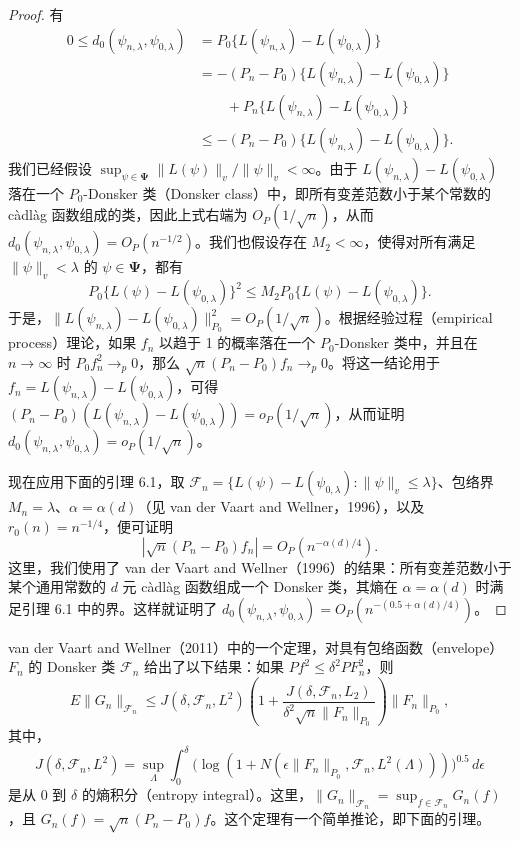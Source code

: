 \begin{proof}
有
\[
 \begin{aligned}
 0\leq d_0(\psi_{n,\lambda},\psi_{0,\lambda})
   & =P_0\{L(\psi_{n,\lambda})-L(\psi_{0,\lambda})\}\\
   & =-(P_n-P_0)\{L(\psi_{n,\lambda})-L(\psi_{0,\lambda})\}\\
   & \qquad{}+P_n\{L(\psi_{n,\lambda})-L(\psi_{0,\lambda})\}\\
   & \leq-(P_n-P_0)\{L(\psi_{n,\lambda})-L(\psi_{0,\lambda})\}.
 \end{aligned}
\]
我们已经假设 $\sup_{\psi\in\boldsymbol{\Psi}}\|L(\psi)\|_v/\|\psi\|_v<\infty$。由于 $L(\psi_{n,\lambda})-L(\psi_{0,\lambda})$ 落在一个 $P_0$-Donsker 类（Donsker class）中，即所有变差范数小于某个常数的 càdlàg 函数组成的类，因此上式右端为 $O_P(1/\sqrt n)$，从而 $d_0(\psi_{n,\lambda},\psi_{0,\lambda})=O_P(n^{-1/2})$。我们也假设存在 $M_2<\infty$，使得对所有满足 $\|\psi\|_v<\lambda$ 的 $\psi\in\boldsymbol{\Psi}$，都有
\[
 P_0\{L(\psi)-L(\psi_{0,\lambda})\}^2
   \leq M_2P_0\{L(\psi)-L(\psi_{0,\lambda})\}.
\]
于是，$\|L(\psi_{n,\lambda})-L(\psi_{0,\lambda})\|_{P_0}^2=O_P(1/\sqrt n)$。根据经验过程（empirical process）理论，如果 $f_n$ 以趋于 1 的概率落在一个 $P_0$-Donsker 类中，并且在 $n\to\infty$ 时 $P_0f_n^2\to_p0$，那么 $\sqrt n(P_n-P_0)f_n\to_p0$。将这一结论用于 $f_n=L(\psi_{n,\lambda})-L(\psi_{0,\lambda})$，可得 $(P_n-P_0)(L(\psi_{n,\lambda})-L(\psi_{0,\lambda}))=o_P(1/\sqrt n)$，从而证明 $d_0(\psi_{n,\lambda},\psi_{0,\lambda})=o_P(1/\sqrt n)$。

现在应用下面的引理 6.1，取 $\mathcal F_n=\{L(\psi)-L(\psi_{0,\lambda}):\|\psi\|_v\leq\lambda\}$、包络界 $M_n=\lambda$、$\alpha=\alpha(d)$（见 van der Vaart and Wellner，1996），以及 $r_0(n)=n^{-1/4}$，便可证明
\[
 |\sqrt n(P_n-P_0)f_n|=O_P(n^{-\alpha(d)/4}).
\]
这里，我们使用了 van der Vaart and Wellner（1996）的结果：所有变差范数小于某个通用常数的 $d$ 元 càdlàg 函数组成一个 Donsker 类，其熵在 $\alpha=\alpha(d)$ 时满足引理 6.1 中的界。这样就证明了 $d_0(\psi_{n,\lambda},\psi_{0,\lambda})=O_P(n^{-(0.5+\alpha(d)/4)})$。
\end{proof}

van der Vaart and Wellner（2011）中的一个定理，对具有包络函数（envelope）$F_n$ 的 Donsker 类 $\mathcal F_n$ 给出了以下结果：如果 $Pf^2\leq\delta^2PF_n^2$，则
\[
 E\|G_n\|_{\mathcal F_n}
 \leq J(\delta,\mathcal F_n,L^2)
       \left(1+\frac{J(\delta,\mathcal F_n,L_2)}
                        {\delta^2\sqrt n\|F_n\|_{P_0}}\right)\|F_n\|_{P_0},
\]
其中，
\[
 J(\delta,\mathcal F_n,L^2)=\sup_\Lambda\int_0^\delta
 \bigl(\log(1+N(\epsilon\|F_n\|_{P_0},\mathcal F_n,L^2(\Lambda)))\bigr)^{0.5}\,d\epsilon
\]
是从 0 到 $\delta$ 的熵积分（entropy integral）。这里，$\|G_n\|_{\mathcal F_n}=\sup_{f\in\mathcal F_n}G_n(f)$，且 $G_n(f)=\sqrt n(P_n-P_0)f$。这个定理有一个简单推论，即下面的引理。

